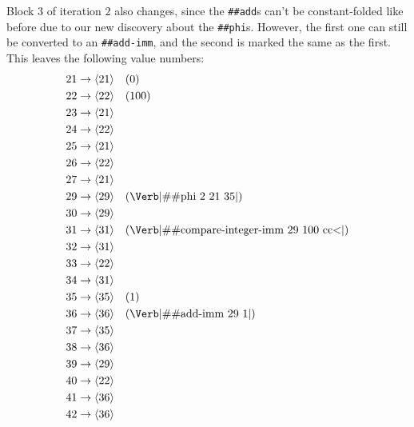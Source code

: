 Block $3$ of iteration $2$ also changes, since the \Verb|##add|s can't be
constant-folded like before due to our new discovery about the \Verb|##phi|s.
However, the first one can still be converted to an \Verb|##add-imm|, and the
second is marked the same as the first.  This leaves the following value
numbers:
%
\begin{align*}
  21 &\to \vn{21} \quad (0)                                                \\
  22 &\to \vn{22} \quad (100)                                              \\
  23 &\to \vn{21}                                                          \\
  24 &\to \vn{22}                                                          \\
  25 &\to \vn{21}                                                          \\
  26 &\to \vn{22}                                                          \\
  27 &\to \vn{21}                                                          \\
  29 &\to \vn{29} \quad (\text{\Verb|\#\#phi 2 21 35|})                    \\
  30 &\to \vn{29}                                                          \\
  31 &\to \vn{31} \quad (\text{\Verb|\#\#compare-integer-imm 29 100 cc<|}) \\
  32 &\to \vn{31}                                                          \\
  33 &\to \vn{22}                                                          \\
  34 &\to \vn{31}                                                          \\
  35 &\to \vn{35} \quad (1)                                                \\
  36 &\to \vn{36} \quad (\text{\Verb|\#\#add-imm 29 1|})                   \\
  37 &\to \vn{35}                                                          \\
  38 &\to \vn{36}                                                          \\
  39 &\to \vn{29}                                                          \\
  40 &\to \vn{22}                                                          \\
  41 &\to \vn{36}                                                          \\
  42 &\to \vn{36}
\end{align*}

